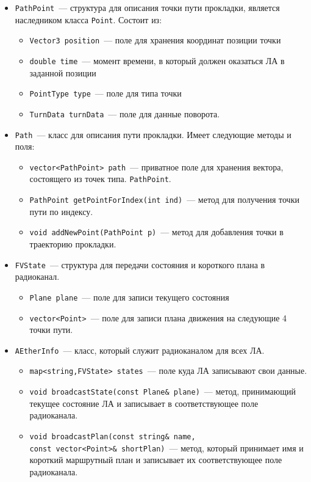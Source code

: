 \documentclass[a4paper,12pt]{article}
\begin{document}
\begin{itemize}
\begin{itemize}
        \end{itemize}
    \item \texttt{PathPoint}~--- структура для описания точки пути прокладки, является наследником класса \texttt{Point}. Состоит из:
    \begin{itemize}
        \item \texttt{Vector3 position}~--- поле для хранения координат позиции точки
        \item \texttt{double time}~--- момент времени, в который должен оказаться ЛА в заданной позиции
        \item \texttt{PointType type}~--- поле для типа точки
        \item  \texttt{TurnData turnData}~--- поле для данные поворота. 
    \end{itemize}
    \item \texttt{Path}~--- класс для описания пути прокладки. Имеет следующие методы и поля:
    \begin{itemize}
        \item \texttt{vector<PathPoint> path}~--- приватное поле для хранения вектора, состоящего из точек типа. \texttt{PathPoint}.
        \item \texttt{PathPoint getPointForIndex(int ind)}~--- метод для получения точки пути по индексу.
        \item \texttt{void addNewPoint(PathPoint p)}~--- метод для добавления точки в траекторию прокладки.
    \end{itemize}
    \item \texttt{FVState}~--- структура для передачи состояния и короткого плана в радиоканал.  
    \begin{itemize}
        \item \texttt{Plane plane}~--- поле для записи текущего состояния
        \item \texttt{vector<Point>}~--- поле для записи плана движения на следующие 4 точки пути.
    \end{itemize}
    \item \texttt{AEtherInfo}~--- класс, который служит радиоканалом для всех ЛА.  
    \begin{itemize}
        \item \texttt{map<string,FVState> states}~---  поле куда ЛА записывают свои данные.
        \item \texttt{void broadcastState(const Plane\& plane)}~--- метод, принимающий текущее состояние ЛА и записывает в соответствующее поле радиоканала.
        \item \texttt{void broadcastPlan(const string\& name,\\ const vector<Point>\& shortPlan)}~--- метод, который принимает имя и короткий маршрутный план и записывает их соответствующее поле радиоканала.

\end{itemize}
\end{itemize}
\end{document}
